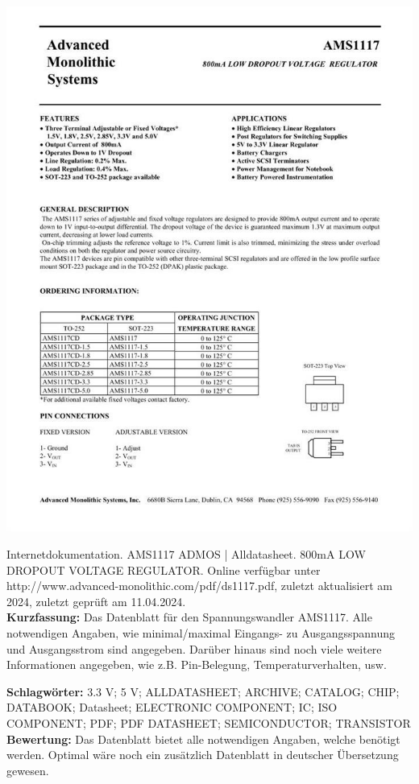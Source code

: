 {
\begin{minipage}{0.38\textwidth}
	\includegraphics[width=\linewidth]{images/AMS.jpg}
\end{minipage}
\hfill
\begin{minipage}{0.6\textwidth}
Internetdokumentation. AMS1117 ADMOS | Alldatasheet. 800mA LOW DROPOUT VOLTAGE REGULATOR.
Online verfügbar unter http://www.advanced-monolithic.com/pdf/ds1117.pdf, zuletzt aktualisiert am 2024, zuletzt geprüft am 11.04.2024.
\\ \textbf{Kurzfassung:}
Das Datenblatt für den Spannungswandler AMS1117. Alle notwendigen Angaben, wie minimal/maximal Eingangs- zu Ausgangsspannung und Ausgangsstrom sind angegeben. Darüber hinaus sind noch viele weitere Informationen angegeben, wie z.B. Pin-Belegung, Temperaturverhalten, usw.
\end{minipage}
\textbf{Schlagwörter:}
3.3 V; 5 V; ALLDATASHEET; ARCHIVE; CATALOG; CHIP; DATABOOK; Datasheet; ELECTRONIC COMPONENT; IC; ISO COMPONENT; PDF; PDF DATASHEET; SEMICONDUCTOR; TRANSISTOR
\\ \textbf{Bewertung:}
Das Datenblatt bietet alle notwendigen Angaben, welche benötigt werden. Optimal wäre noch ein zusätzlich Datenblatt in deutscher Übersetzung gewesen.
}

